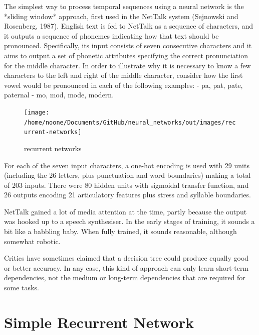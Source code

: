 \documentclass[11pt]{article}
\begin{document}
The simplest way to process temporal sequences using a neural network is the *sliding window* approach, first used in the NetTalk system (Sejnowski and Rosenberg, 1987).
English text is fed to NetTalk as a sequence of characters, and it outputs a sequence of phonemes indicating how that text should be pronounced.
Specifically, its input consists of seven consecutive characters and it aims to output a set of phonetic attributes specifying the correct pronunciation for the middle character.
In order to illustrate why it is necessary to know a few characters to the left and right of the middle character, consider how the first vowel would be pronounced in each of the following examples:
- pa, pat, pate, paternal
- mo, mod, mode, modern.

\begin{figure}
    \centering
    \texttt{[image: /home/noone/Documents/GitHub/neural\_networks/out/images/recurrent-networks]}
    \caption[recurrent networks]{recurrent networks}
    \label{fig: recurrent networks}
\end{figure}

For each of the seven input characters, a one-hot encoding is used with 29 units (including the 26 letters, plus punctuation and word boundaries) making a total of 203 inputs.
There were 80 hidden units with sigmoidal transfer function, and 26 outputs encoding 21 articulatory features plus stress and syllable boundaries.

NetTalk gained a lot of media attention at the time, partly because the output was hooked up to a speech synthesiser.
In the early stages of training, it sounds a bit like a babbling baby.
When fully trained, it sounds reasonable, although somewhat robotic.


Critics have sometimes claimed that a decision tree could produce equally good or better accuracy.
In any case, this kind of approach can only learn short-term dependencies, not the medium or long-term dependencies that are required for some tasks.

\section{Simple Recurrent Network}\label{sec:simple-recurrent-network}
\end{document}
